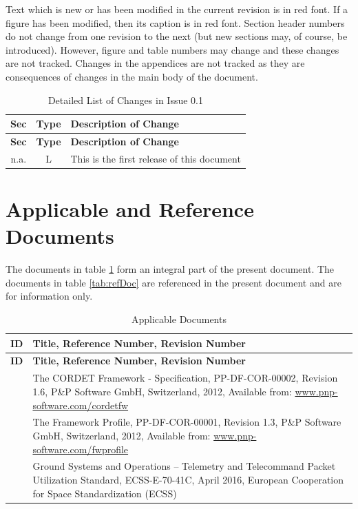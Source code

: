 \documentclass[a4paper,10pt]{article}
\let\stdsection\section
\renewcommand\section{\newpage\stdsection}
\begin{document}
Text which is new or has been modified in the current revision is in red font. If a figure has been modified, then its caption is in red font. Section header numbers do not change from one revision to the next (but new sections may, of course, be introduced). However, figure and table numbers may change and these changes are not tracked. Changes in the appendices are not tracked as they are consequences of changes in the main body of the document.

\begin{longtable}{|c|c|p{10cm}|}
\caption{Detailed List of Changes in Issue 0.1} \\
\hline
\rowcolor{light-gray}
\textbf{Sec} & \textbf{Type} & \textbf{Description of Change} \\
\hline\hline
\endfirsthead
\rowcolor{light-gray}
\textbf{Sec} & \textbf{Type} & \textbf{Description of Change} \\
\hline\hline
\endhead
n.a. & L & This is the first release of this document \\
\hline
\end{longtable}






\newpage

\section{Applicable and Reference Documents}

The documents in table \ref{tab:appDoc} form an integral part of the present document. The documents in table \ref{tab:refDoc} are referenced in the present document and are for information only.

\begin{longtable}{|c|p{11cm}|}
\caption{Applicable Documents} \label{tab:appDoc}\\
\hline
\rowcolor{light-gray}
\textbf{ID} & \textbf{Title, Reference Number, Revision Number} \\
\hline\hline
\endfirsthead
\rowcolor{light-gray}
\textbf{ID} & \textbf{Title, Reference Number, Revision Number} \\
\hline\hline
\endhead
[CR-SP] & The CORDET Framework - Specification, PP-DF-COR-00002, Revision 1.6, P\&P Software GmbH, Switzerland, 2012, Available from: \url{www.pnp-software.com/cordetfw} \\
\hline
[FW-SP] & The Framework Profile, PP-DF-COR-00001, Revision 1.3, P\&P Software GmbH, Switzerland, 2012, Available from: \url{www.pnp-software.com/fwprofile} \\
\hline
[PS-SP] & Ground Systems and Operations – Telemetry and Telecommand Packet Utilization Standard, ECSS-E-70-41C, April 2016, European Cooperation for Space Standardization (ECSS) \\
\hline
\end{longtable}
\end{document}
